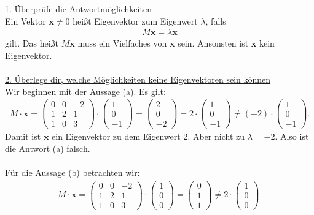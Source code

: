 \underline{1. Überprüfe die Antwortmöglichkeiten}\\
Ein Vektor $ \textbf{x} \neq 0 $ heißt Eigenvektor zum Eigenwert $ \lambda $, falls
\begin{align*}
M \textbf{x} = \lambda \textbf{x}
\end{align*}
gilt. Das heißt $ M \textbf{x} $ muss ein Vielfaches von $ \textbf{x} $ sein.
Ansonsten ist $ \textbf{x} $ kein Eigenvektor.\\
\\
\underline{2. Überlege dir, welche Möglichkeiten keine Eigenvektoren sein können}\\
Wir beginnen mit der Aussage (a). Es gilt:
\begin{align*}
M \cdot \textbf{x} = 
\begin{pmatrix}
0 & 0 & -2\\
1 & 2 & 1\\
1 & 0 & 3
\end{pmatrix}
\cdot 
\begin{pmatrix}
1 \\ 0 \\ -1
\end{pmatrix}
=
\begin{pmatrix}
2 \\ 0  \\-2
\end{pmatrix}
= 
2 \cdot 
\begin{pmatrix}
1 \\ 0 \\ -1
\end{pmatrix}
\neq
(-2) \cdot \begin{pmatrix}
1 \\ 0 \\ -1
\end{pmatrix}.
\end{align*}
Damit ist $ \textbf{x}  $ ein Eigenvektor zu dem Eigenwert $ 2 $. 
Aber nicht zu $ \lambda = -2 $.
Also ist die Antwort (a) falsch.\\
\\
Für die Aussage (b) betrachten wir:
\begin{align*}
M \cdot \textbf{x} = 
\begin{pmatrix}
0 & 0 & -2\\
1 & 2 & 1\\
1 & 0 & 3
\end{pmatrix}
\cdot 
\begin{pmatrix}
1 \\ 0 \\ 0
\end{pmatrix}
= 
\begin{pmatrix}
0 \\ 1 \\ 1
\end{pmatrix} \neq 2 \cdot \begin{pmatrix}
1 \\ 0 \\ 0
\end{pmatrix}.
\end{align*}
